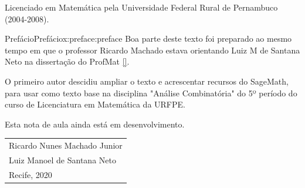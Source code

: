 \documentclass[oneside,10pt,]{book}
\newcommand{\xreffont}{\relax}
\numberwithin{equation}{section}
\begin{document}
Licenciado em Matemática pela Universidade Federal Rural de Pernambuco (2004-2008).%
\par
{}
\null\clearpage
%
%
\typeout{************************************************}
\typeout{************************************************}
%
\begin{preface}{Prefácio}{}{Prefácio}{}{}{x:preface:preface}
Boa parte deste texto foi preparado ao mesmo tempo em que o professor Ricardo Machado estava orientando Luiz M de Santana Neto na dissertação do ProfMat \hyperlink{x:biblio:luiz}{[{\xreffont 6.9}]}.%
\par
O primeiro autor descidiu ampliar o texto e acrescentar recursos do SageMath, para usar como texto base na disciplina "Análise Combinatória" do 5º período do curso de Licenciatura em Matemática da URFPE.%
\par
Esta nota de aula ainda está em desenvolvimento.%
\par
%
\nopagebreak\par%
\hfill\begin{tabular}[t]{l@{}}
Ricardo Nunes Machado Junior\\
Luiz Manoel de Santana Neto\\
Recife, 2020
\end{tabular}\\\par
\end{preface}
\setcounter{tocdepth}{1}
\renewcommand*\contentsname{Sumário}
\tableofcontents
\mainmatter
%
%
\typeout{************************************************}
\typeout{************************************************}
%
\end{document}
